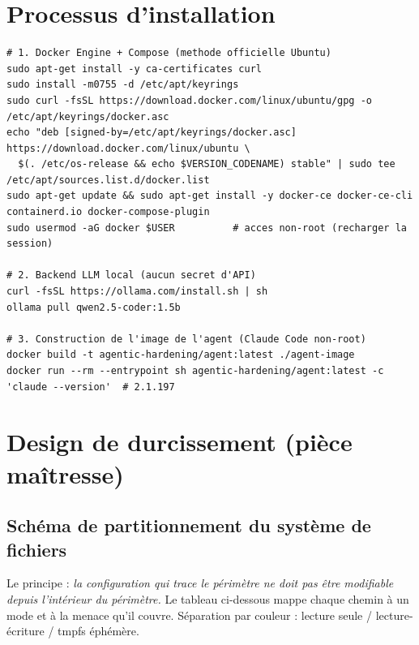 \documentclass[11pt,a4paper]{article}
\begin{document}
\section{Processus d'installation}
\begin{lstlisting}[style=sh]
# 1. Docker Engine + Compose (methode officielle Ubuntu)
sudo apt-get install -y ca-certificates curl
sudo install -m0755 -d /etc/apt/keyrings
sudo curl -fsSL https://download.docker.com/linux/ubuntu/gpg -o /etc/apt/keyrings/docker.asc
echo "deb [signed-by=/etc/apt/keyrings/docker.asc] https://download.docker.com/linux/ubuntu \
  $(. /etc/os-release && echo $VERSION_CODENAME) stable" | sudo tee /etc/apt/sources.list.d/docker.list
sudo apt-get update && sudo apt-get install -y docker-ce docker-ce-cli containerd.io docker-compose-plugin
sudo usermod -aG docker $USER          # acces non-root (recharger la session)

# 2. Backend LLM local (aucun secret d'API)
curl -fsSL https://ollama.com/install.sh | sh
ollama pull qwen2.5-coder:1.5b

# 3. Construction de l'image de l'agent (Claude Code non-root)
docker build -t agentic-hardening/agent:latest ./agent-image
docker run --rm --entrypoint sh agentic-hardening/agent:latest -c 'claude --version'  # 2.1.197
\end{lstlisting}

\section{Design de durcissement \textmd{\normalsize(pièce maîtresse)}}

\subsection{Schéma de partitionnement du système de fichiers}
Le principe : \emph{la configuration qui trace le périmètre ne doit pas être modifiable depuis
l'intérieur du périmètre.} Le tableau ci-dessous mappe chaque chemin à un mode et à la menace qu'il
couvre. Séparation par couleur : \colorbox{roc}{lecture seule} / \colorbox{rwc}{lecture-écriture} /
\colorbox{tmpc}{tmpfs éphémère}.
\end{document}
